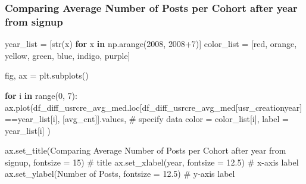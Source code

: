 \documentclass[
  letterpaper,
  DIV=11,
  numbers=noendperiod]{scrartcl}
\newenvironment{Shaded}{\begin{snugshade}}{\end{snugshade}}
\newcommand{\BuiltInTok}[1]{\textcolor[rgb]{0.00,0.23,0.31}{#1}}
\newcommand{\CommentTok}[1]{\textcolor[rgb]{0.37,0.37,0.37}{#1}}
\newcommand{\ControlFlowTok}[1]{\textcolor[rgb]{0.00,0.23,0.31}{\textbf{#1}}}
\newcommand{\DecValTok}[1]{\textcolor[rgb]{0.68,0.00,0.00}{#1}}
\newcommand{\FloatTok}[1]{\textcolor[rgb]{0.68,0.00,0.00}{#1}}
\newcommand{\KeywordTok}[1]{\textcolor[rgb]{0.00,0.23,0.31}{\textbf{#1}}}
\newcommand{\NormalTok}[1]{\textcolor[rgb]{0.00,0.23,0.31}{#1}}
\newcommand{\OperatorTok}[1]{\textcolor[rgb]{0.37,0.37,0.37}{#1}}
\newcommand{\StringTok}[1]{\textcolor[rgb]{0.13,0.47,0.30}{#1}}
\begin{document}
\subsubsection{Comparing Average Number of Posts per Cohort after year
from
signup}\label{comparing-average-number-of-posts-per-cohort-after-year-from-signup}

\begin{Shaded}
\begin{Highlighting}[]
\NormalTok{year\_list }\OperatorTok{=}\NormalTok{ [}\BuiltInTok{str}\NormalTok{(x) }\ControlFlowTok{for}\NormalTok{ x }\KeywordTok{in}\NormalTok{ np.arange(}\DecValTok{2008}\NormalTok{, }\DecValTok{2008}\OperatorTok{+}\DecValTok{7}\NormalTok{)]}
\NormalTok{color\_list }\OperatorTok{=}\NormalTok{ [}\StringTok{\textquotesingle{}red\textquotesingle{}}\NormalTok{, }\StringTok{\textquotesingle{}orange\textquotesingle{}}\NormalTok{, }\StringTok{\textquotesingle{}yellow\textquotesingle{}}\NormalTok{, }\StringTok{\textquotesingle{}green\textquotesingle{}}\NormalTok{, }\StringTok{\textquotesingle{}blue\textquotesingle{}}\NormalTok{, }\StringTok{\textquotesingle{}indigo\textquotesingle{}}\NormalTok{, }\StringTok{\textquotesingle{}purple\textquotesingle{}}\NormalTok{]}

\NormalTok{fig, ax }\OperatorTok{=}\NormalTok{ plt.subplots()}

\ControlFlowTok{for}\NormalTok{ i }\KeywordTok{in} \BuiltInTok{range}\NormalTok{(}\DecValTok{0}\NormalTok{, }\DecValTok{7}\NormalTok{):    }
\NormalTok{        ax.plot(df\_diff\_usrcre\_avg\_med.loc[df\_diff\_usrcre\_avg\_med[}\StringTok{\textquotesingle{}usr\_creationyear\textquotesingle{}}\NormalTok{]}\OperatorTok{==}\NormalTok{year\_list[i], [}\StringTok{\textquotesingle{}avg\_cnt\textquotesingle{}}\NormalTok{]].values, }\CommentTok{\# specify data}
\NormalTok{                color }\OperatorTok{=}\NormalTok{ color\_list[i],}
\NormalTok{                label }\OperatorTok{=}\NormalTok{ year\_list[i]}
\NormalTok{        ) }

\NormalTok{ax.set\_title(}\StringTok{\textquotesingle{}Comparing Average Number of Posts per Cohort after year from signup\textquotesingle{}}\NormalTok{, fontsize }\OperatorTok{=} \DecValTok{15}\NormalTok{) }\CommentTok{\# title}
\NormalTok{ax.set\_xlabel(}\StringTok{\textquotesingle{}year\textquotesingle{}}\NormalTok{, fontsize }\OperatorTok{=} \FloatTok{12.5}\NormalTok{) }\CommentTok{\# x{-}axis label}
\NormalTok{ax.set\_ylabel(}\StringTok{\textquotesingle{}Number of Posts\textquotesingle{}}\NormalTok{, fontsize }\OperatorTok{=} \FloatTok{12.5}\NormalTok{) }\CommentTok{\# y{-}axis label}


\end{Highlighting}
\end{Shaded}
\end{document}
